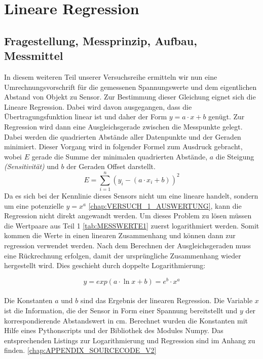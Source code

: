 \documentclass[12pt,oneside,a4paper]{report}
\begin{document}

%
%
\chapter{Lineare Regression}
\label{chap:VERSUCH_2}

\section{Fragestellung, Messprinzip, Aufbau, Messmittel}
\label{chap:VERSUCH_2_FRAGESTELLUNG}
In diesem weiteren Teil unserer Versuchsreihe ermitteln wir nun eine Umrechnungsvorschrift für die gemessenen Spannungswerte und dem eigentlichen Abstand von Objekt zu Sensor.
Zur Bestimmung dieser Gleichung eignet sich die Lineare Regression.
Dabei wird davon ausgegangen, dass die Übertragungsfunktion linear ist und daher der Form $y = a \cdot x + b$ genügt. Zur Regression wird dann eine Ausgleichsgerade zwischen die Messpunkte gelegt. Dabei werden die quadrierten Abstände aller Datenpunkte und der Geraden minimiert. Dieser Vorgang wird in folgender Formel zum Ausdruck gebracht, wobei $E$ gerade die Summe der minimalen quadrierten Abstände, $a$ die Steigung \textit{(Sensitivität)} und $b$ der Geraden Offset darstellt.
\begin{equation}
 E = \sum_{i=1}^{n} (y_i - (a\cdot x_i + b))^2
\end{equation}
Da es sich bei der Kennlinie dieses Sensors nicht um eine lineare handelt, sondern um eine potenzielle $y = x^a$ \ref{chap:VERSUCH_1_AUSWERTUNG}, kann die Regression nicht direkt angewandt werden. Um dieses Problem zu lösen müssen die Wertpaare aus Teil 1 \ref{tab:MESSWERTE1} zuerst logarithmiert werden. Somit kommen die Werte in einen linearen Zusammenhang und können dann zur regression verwendet werden.
Nach dem Berechnen der Ausgleichsgeraden muss eine Rückrechnung erfolgen, damit der ursprüngliche Zusammenhang wieder hergestellt wird. Dies geschieht durch doppelte Logarithmierung:

\begin{equation}
y = exp(a \cdot \ln x \plus b) = e^b \cdot x^a
\end{equation}
\\
Die Konstanten $a$ und $b$ sind das Ergebnis der linearen Regression. Die Variable $x$ ist die Information, die der Sensor in Form einer Spannung bereitstellt und $y$ der korrespondierende Abstandswert in cm.
Berechnet wurden die Konstanten mit Hilfe eines Pythonscripts und der Bibliothek des Modules Numpy. Das entsprechenden Listings zur Logarithmierung und Regression sind im Anhang zu finden. \ref{chap:APPENDIX_SOURCECODE_V2} 
 
\end{document}
